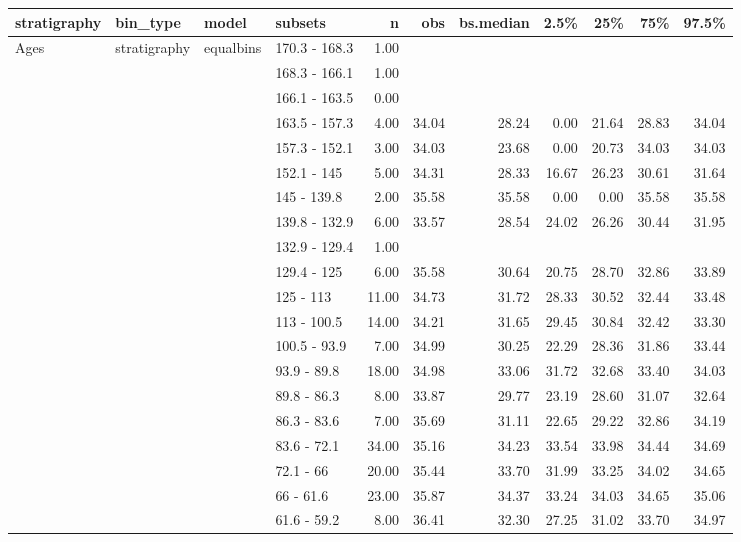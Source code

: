\begin{longtable}{llllrrrrrrr}
  \hline
stratigraphy & bin\_type & model & subsets & n & obs & bs.median & 2.5\% & 25\% & 75\% & 97.5\% \\ 
  \hline
Ages & stratigraphy & equalbins & 170.3 - 168.3 & 1.00 &  &  &  &  &  &  \\ 
   &  &  & 168.3 - 166.1 & 1.00 &  &  &  &  &  &  \\ 
   &  &  & 166.1 - 163.5 & 0.00 &  &  &  &  &  &  \\ 
   &  &  & 163.5 - 157.3 & 4.00 & 34.04 & 28.24 & 0.00 & 21.64 & 28.83 & 34.04 \\ 
   &  &  & 157.3 - 152.1 & 3.00 & 34.03 & 23.68 & 0.00 & 20.73 & 34.03 & 34.03 \\ 
   &  &  & 152.1 - 145 & 5.00 & 34.31 & 28.33 & 16.67 & 26.23 & 30.61 & 31.64 \\ 
   &  &  & 145 - 139.8 & 2.00 & 35.58 & 35.58 & 0.00 & 0.00 & 35.58 & 35.58 \\ 
   &  &  & 139.8 - 132.9 & 6.00 & 33.57 & 28.54 & 24.02 & 26.26 & 30.44 & 31.95 \\ 
   &  &  & 132.9 - 129.4 & 1.00 &  &  &  &  &  &  \\ 
   &  &  & 129.4 - 125 & 6.00 & 35.58 & 30.64 & 20.75 & 28.70 & 32.86 & 33.89 \\ 
   &  &  & 125 - 113 & 11.00 & 34.73 & 31.72 & 28.33 & 30.52 & 32.44 & 33.48 \\ 
   &  &  & 113 - 100.5 & 14.00 & 34.21 & 31.65 & 29.45 & 30.84 & 32.42 & 33.30 \\ 
   &  &  & 100.5 - 93.9 & 7.00 & 34.99 & 30.25 & 22.29 & 28.36 & 31.86 & 33.44 \\ 
   &  &  & 93.9 - 89.8 & 18.00 & 34.98 & 33.06 & 31.72 & 32.68 & 33.40 & 34.03 \\ 
   &  &  & 89.8 - 86.3 & 8.00 & 33.87 & 29.77 & 23.19 & 28.60 & 31.07 & 32.64 \\ 
   &  &  & 86.3 - 83.6 & 7.00 & 35.69 & 31.11 & 22.65 & 29.22 & 32.86 & 34.19 \\ 
   &  &  & 83.6 - 72.1 & 34.00 & 35.16 & 34.23 & 33.54 & 33.98 & 34.44 & 34.69 \\ 
   &  &  & 72.1 - 66 & 20.00 & 35.44 & 33.70 & 31.99 & 33.25 & 34.02 & 34.65 \\ 
   &  &  & 66 - 61.6 & 23.00 & 35.87 & 34.37 & 33.24 & 34.03 & 34.65 & 35.06 \\ 
   &  &  & 61.6 - 59.2 & 8.00 & 36.41 & 32.30 & 27.25 & 31.02 & 33.70 & 34.97 \\ 

\end{longtable}
